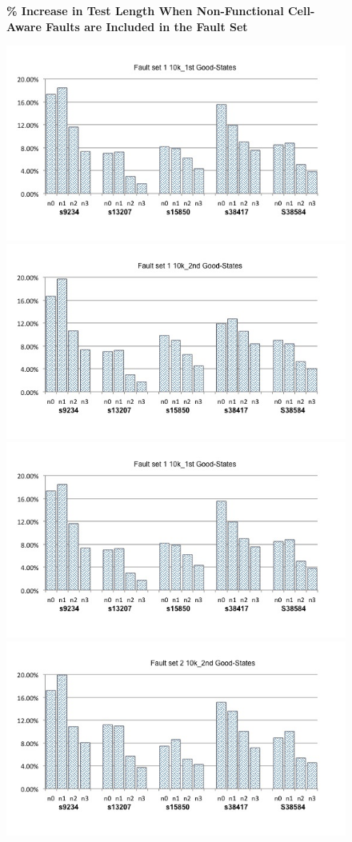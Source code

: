 \documentclass[12pt]{article}
\begin{document}
\begin{figure}[H]
\begin{center}
\textbf{\% Increase in Test Length When Non-Functional Cell-Aware Faults are Included in the Fault Set}\par\medskip
\end{center}
\begin{@twocolumntrue}
\includegraphics[scale=0.25,width=0.5\linewidth]{../percentage_increase_set1_10k_1st.jpg}
\includegraphics[scale=0.25,width=0.5\linewidth]{../percentage_increase_set1_10k_2nd.jpg}\\ 
\includegraphics[scale=0.25,width=0.5\linewidth]{../percentage_increase_set1_10k_1st.jpg}
\includegraphics[scale=0.25,width=0.5\linewidth]{../percentage_increase_set2_10k_2nd.jpg}
\end{@twocolumntrue}
\end{figure}
\end{document}
